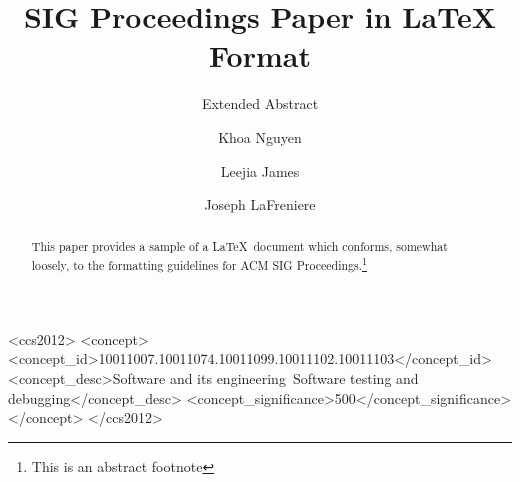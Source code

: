 \documentclass[sigconf]{acmart}
\begin{document}
\title{SIG Proceedings Paper in LaTeX Format}
\subtitle{Extended Abstract}


\author{Khoa Nguyen}

\author{Leejia James}

\author{Joseph LaFreniere}

\begin{abstract}
This paper provides a sample of a \LaTeX\ document which conforms,
somewhat loosely, to the formatting guidelines for
ACM SIG Proceedings.\footnote{This is an abstract footnote}
\end{abstract}

%
%
\begin{CCSXML}
  <ccs2012>
  <concept>
  <concept_id>10011007.10011074.10011099.10011102.10011103</concept_id>
  <concept_desc>Software and its engineering~Software testing and debugging</concept_desc>
  <concept_significance>500</concept_significance>
  </concept>
  </ccs2012>
\end{CCSXML}




\maketitle





\end{document}
